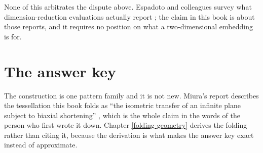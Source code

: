 \documentclass[
  british,
  a4paper,
]{book}
\newenvironment{Shaded}{\begin{snugshade}}{\end{snugshade}}
\newcommand{\AttributeTok}[1]{\textcolor[rgb]{0.13,0.29,0.53}{#1}}
\newcommand{\DecValTok}[1]{\textcolor[rgb]{0.00,0.00,0.81}{#1}}
\newcommand{\FunctionTok}[1]{\textcolor[rgb]{0.13,0.29,0.53}{\textbf{#1}}}
\newcommand{\NormalTok}[1]{#1}
\newcommand{\OtherTok}[1]{\textcolor[rgb]{0.56,0.35,0.01}{#1}}
\newcommand{\SpecialCharTok}[1]{\textcolor[rgb]{0.81,0.36,0.00}{\textbf{#1}}}
\newcommand{\StringTok}[1]{\textcolor[rgb]{0.31,0.60,0.02}{#1}}
\begin{document}
None of this arbitrates the dispute above. Espadoto and colleagues survey what
dimension-reduction evaluations actually report \citep{espadoto2021survey}; the claim
in this book is about those reports, and it requires no position on what a
two-dimensional embedding is for.

\section{The answer key}\label{intro-core}

The construction is one pattern family and it is not new. Miura's report
describes the tessellation this book folds as ``the isometric transfer of an
infinite plane subject to biaxial shortening'' \citep{miura1985method}, which is the
whole claim in the words of the person who first wrote it down. Chapter
\ref{folding-geometry} derives the folding rather than citing it, because the
derivation is what makes the answer key exact instead of approximate.

\begin{Shaded}
\end{Shaded}
\end{document}

